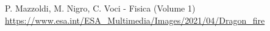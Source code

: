 
P. Mazzoldi, M. Nigro, C. Voci - Fisica (Volume 1)
\href{https://www.esa.int/ESA_Multimedia/Images/2021/04/Dragon_fire}{
    https://www.esa.int/ESA\_Multimedia/Images/2021/04/Dragon\_fire}
